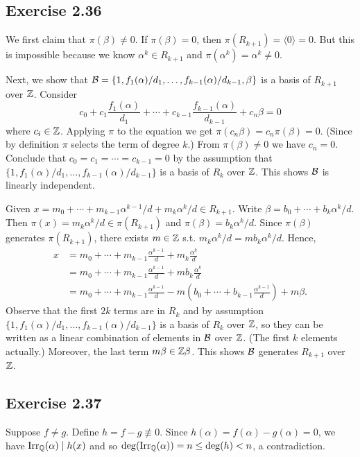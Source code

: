 \documentclass[../Marcus.tex]{subfiles}
\begin{document}
\subsection*{Exercise 2.36}

We first claim that $\pi(\beta)\neq 0$. If $\pi(\beta)=0$, then $\pi(R_{k+1})=\langle0\rangle=0$. But this is impossible because we know $\alpha^k\in R_{k+1}$ and $\pi(\alpha^k)=\alpha^k\neq0$.

Next, we show that $\mathcal{B}=\{1,f_1(\alpha)/d_1,\ldots,f_{k-1}(\alpha)/d_{k-1},\beta\}$ is a basis of $R_{k+1}$ over $\mathbb{Z}$. Consider 
$$
c_0+c_1\frac{f_1(\alpha)}{d_1}+\cdots+c_{k-1}\frac{f_{k-1}(\alpha)}{d_{k-1}}+c_n\beta=0
$$ 
where $c_i\in\mathbb{Z}$. Applying $\pi$ to the equation we get $\pi(c_n\beta)=c_n\pi(\beta)=0$. (Since by definition $\pi$ selects the term of degree $k$.) From $\pi(\beta)\neq 0$ we have $c_n=0$. Conclude that $c_0=c_1=\cdots=c_{k-1}=0$ by the assumption that $\{1,f_1(\alpha)/d_1,\ldots,f_{k-1}(\alpha)/d_{k-1}\}$ is a basis of $R_k$ over $\mathbb{Z}$. This shows $\mathcal{B}$ is linearly independent.

Given $x=m_0+\cdots+m_{k-1}\alpha^{k-1}/d+m_k\alpha^k/d \in R_{k+1}$. Write $\beta=b_0+\cdots+b_k\alpha^k/d$. Then $\pi(x)=m_k\alpha^k/d \in \pi(R_{k+1})$ and $\pi(\beta)=b_k\alpha^k/d$. Since $\pi(\beta)$ generates $\pi(R_{k+1})$, there exists $m\in\mathbb{Z}$ s.t. $m_k\alpha^k/d=mb_k\alpha^k/d$. Hence,
\begin{align*}
    x &= m_0+\cdots+m_{k-1}\frac{\alpha^{k-1}}{d}+m_k\frac{\alpha^k}{d} \\
    &= m_0+\cdots+m_{k-1}\frac{\alpha^{k-1}}{d}+mb_k\frac{\alpha^k}{d} \\
    &= m_0+\cdots+m_{k-1}\frac{\alpha^{k-1}}{d}-m\left(b_0+\cdots+b_{k-1}\frac{\alpha^{k-1}}{d}\right)+m\beta.
\end{align*}
Observe that the first $2k$ terms are in $R_{k}$ and by assumption $\{1,f_1(\alpha)/d_1,\ldots,f_{k-1}(\alpha)/d_{k-1}\}$ is a basis of $R_k$ over $\mathbb{Z}$, so they can be written as a linear combination of elements in $\mathcal{B}$ over $\mathbb{Z}$. (The first $k$ elements actually.) Moreover, the last term $m\beta\in\mathbb{Z}\beta$. This shows $\mathcal{B}$ generates $R_{k+1}$ over $\mathbb{Z}$.

\subsection*{Exercise 2.37}

Suppose $f\neq g$. Define $h=f-g\not\equiv0$. Since $h(\alpha)=f(\alpha)-g(\alpha)=0$, we have $\operatorname{Irr}_{\mathbb{Q}}(\alpha)\mid h(x)$ and so $\deg(\operatorname{Irr}_{\mathbb{Q}}(\alpha))=n\leq\deg(h)<n$, a contradiction.
\end{document}
